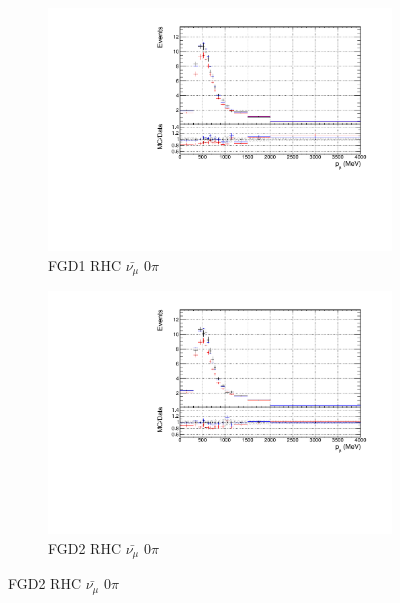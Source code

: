 \begin{figure}[!h]
\begin{subfigure}{0.49\textwidth}
  \centering
  \includegraphics[width=\textwidth]{figs/priorpred1D_p_FGD1_anti-numuCC_0pi}
  \caption{FGD1 RHC $\bar{\nu_{\mu}}$ 0$\pi$}
\end{subfigure}
\begin{subfigure}{0.49\textwidth}
  \centering
  \includegraphics[width=\textwidth]{figs/priorpred1D_p_FGD2_anti-numuCC_0pi}
  \caption{FGD2 RHC $\bar{\nu_{\mu}}$ 0$\pi$}
\end{subfigure}


\end{figure}
